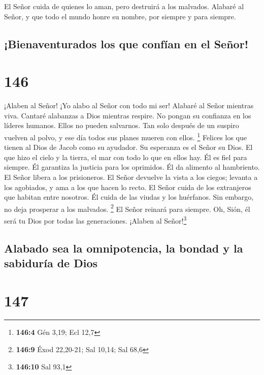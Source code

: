  El Señor cuida de quienes lo aman, pero destruirá a los
malvados.  Alabaré al Señor, y que todo el mundo honre su
nombre, por siempre y para siempre.

\hypertarget{bienaventurados-los-que-confuxedan-en-el-seuxf1or}{%
\subsection{¡Bienaventurados los que confían en el
Señor!}\label{bienaventurados-los-que-confuxedan-en-el-seuxf1or}}

\hypertarget{section-145}{%
\section{146}\label{section-145}}

 ¡Alaben al Señor! ¡Yo alabo al Señor con todo mi ser!
 Alabaré al Señor mientras viva. Cantaré alabanzas a Dios
mientras respire.  No pongan su confianza en los líderes
humanos. Ellos no pueden salvarnos.  Tan solo después de
un suspiro vuelven al polvo, y ese día todos sus planes mueren con
ellos. \footnote{\textbf{146:4} Gén 3,19; Ecl 12,7} 
Felices los que tienen al Dios de Jacob como su ayudador. Su esperanza
es el Señor su Dios.  El que hizo el cielo y la tierra, el
mar con todo lo que en ellos hay. Él es fiel para siempre.
 Él garantiza la justicia para los oprimidos. Él da
alimento al hambriento. El Señor libera a los prisioneros.
 El Señor devuelve la vista a los ciegos; levanta a los
agobiados, y ama a los que hacen lo recto.  El Señor cuida
de los extranjeros que habitan entre nosotros. Él cuida de las viudas y
los huérfanos. Sin embargo, no deja prosperar a los malvados.
\footnote{\textbf{146:9} Éxod 22,20-21; Sal 10,14; Sal 68,6}
 El Señor reinará para siempre. Oh, Sión, él será tu Dios
por todas las generaciones. ¡Alaben al Señor!\footnote{\textbf{146:10}
  Sal 93,1}

\hypertarget{alabado-sea-la-omnipotencia-la-bondad-y-la-sabiduruxeda-de-dios}{%
\subsection{Alabado sea la omnipotencia, la bondad y la sabiduría de
Dios}\label{alabado-sea-la-omnipotencia-la-bondad-y-la-sabiduruxeda-de-dios}}

\hypertarget{section-146}{%
\section{147}\label{section-146}}

